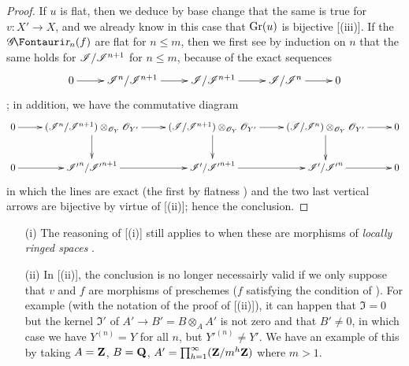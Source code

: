\begin{proof}
If $u$ is flat, then we deduce by base change that the same is true for $v:X' \to X$, and we already know in this case that $\operatorname{Gr}(u)$ is bijective [(iii)].
If the $\shGr_n(f)$ are flat for $n\leq m$, then we first see by induction on $n$ that the same holds for $\mathscr{I}/\mathscr{I}^{n+1}$ for $n\leq m$, because of the exact sequences
  \[
    \xymatrix{
      0 \ar[r] & \sh{I}^n/\sh{I}^{n+1} \ar[r] & \sh{I}/\sh{I}^{n+1} \ar[r] & \sh{I}/\sh{I}^{n} \ar[r] & 0
    }
  \]
  ;
  in addition, we have the commutative diagram
  \[
    \xymatrix{
      0 \ar[r] & (\sh{I}^n/\sh{I}^{n+1}) \otimes_{\sh{O}_Y}\sh{O}_{Y'} \ar[d]\ar[r] &( \sh{I}/\sh{I}^{n+1}) \otimes_{\sh{O}_Y}\sh{O}_{Y'} \ar[d]\ar[r] & (\sh{I}/\sh{I}^{n}) \otimes_{\sh{O}_Y}\sh{O}_{Y'} \ar[d]\ar[r] & 0 \\
      0 \ar[r] & \sh{I'}^n/\sh{I'}^{n+1} \ar[r] & \sh{I'}/\sh{I'}^{n+1} \ar[r] & \sh{I'}/\sh{I'}^{n} \ar[r] & 0
    }
  \]
  in which the lines are exact (the first by flatness ) and the two last vertical arrows are bijective by virtue of [(ii)];
  hence the conclusion.
\end{proof}

\begin{remarks}[16.2.5]
\label{IV.16.2.5}
\medskip\noindent
\begin{enumerate}
  \item[(i)] The reasoning of [(i)] still applies to  when these are morphisms of \emph{locally ringed spaces} .
  \item[(ii)] In [(ii)], the conclusion is no longer necessairly valid if we only suppose that $v$ and $f$ are morphisms of preschemes ($f$ satisfying the condition of ).
  For example (with the notation of the proof of [(ii)]), it can happen that $\mathfrak{I} = 0$ but the kernel $\mathfrak{I}'$ of $A' \to B' = B \otimes_A A'$ is not zero and that $B' \neq 0$, in which case we have $Y^{(n)} = Y$ for all $n$, but ${Y'}^{(n)} \neq Y'$.
  We have an example of this by taking $A = \mathbf{Z}$, $B = \mathbf{Q}$, $A' = \prod_{h = 1}^\infty (\mathbf{Z}/m^h\mathbf{Z})$ where $m>1$.
\end{enumerate}
\end{remarks}

